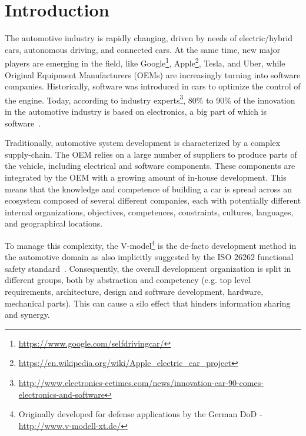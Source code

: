 \section{Introduction}\label{sec:intro}


The automotive industry is rapidly %
changing, driven by needs of 
electric/hybrid cars, autonomous driving, and connected cars. 
At the same time, new major players are emerging in the field, like Google\footnote{\url{https://www.google.com/selfdrivingcar/}},  %
Apple\footnote{\url{https://en.wikipedia.org/wiki/Apple_electric_car_project}}, %
 Tesla, and Uber, while Original Equipment Manufacturers (OEMs) are increasingly turning into software companies. 
Historically, software was introduced in cars to optimize the control of the engine. 
Today, according to industry experts\footnote{\url{http://www.electronics-eetimes.com/news/innovation-car-90-comes-electronics-and-software}}, 80\% to 90\% of the innovation in the automotive industry is based on electronics, a big part of which is software~\cite{ESEM2016}. 

Traditionally, automotive system development is characterized by a complex supply-chain.
The OEM relies on a large number of suppliers to produce parts of the vehicle, including electrical and software components.
These components are integrated by the OEM with a growing amount of in-house development.
This means that the knowledge and competence of building a car is spread across an ecosystem composed of several different companies, each with potentially different internal organizations, objectives, competences, constraints, cultures, languages, and geographical locations. 

To manage this complexity, the V-model\footnote{Originally developed for defense applications by the German DoD - \url{http://www.v-modell-xt.de/}} %
is the de-facto development method in the automotive domain as also implicitly suggested by the ISO 26262 functional safety standard~\cite{iso26262}.
Consequently, the overall development organization is split in different groups, both by abstraction and competency (e.g. top level requirements,
architecture, design and software development, hardware, mechanical parts).%
This can cause a silo effect that hinders information sharing and synergy. %


